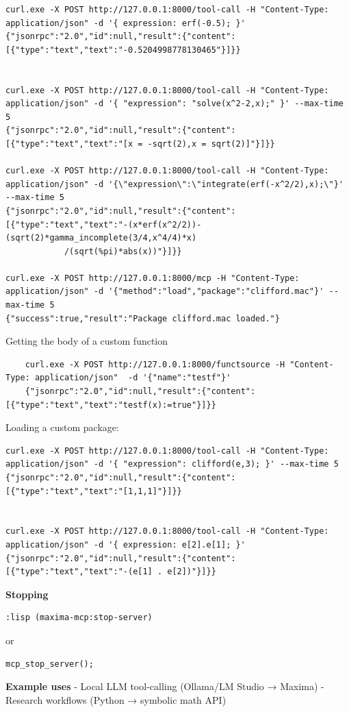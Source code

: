 \documentclass[12pt]{article}
\begin{document}
\begin{verbatim}
curl.exe -X POST http://127.0.0.1:8000/tool-call -H "Content-Type: application/json" -d '{ expression: erf(-0.5); }'
{"jsonrpc":"2.0","id":null,"result":{"content":[{"type":"text","text":"-0.5204998778130465"}]}}


curl.exe -X POST http://127.0.0.1:8000/tool-call -H "Content-Type: application/json" -d '{ "expression": "solve(x^2-2,x);" }' --max-time 5
{"jsonrpc":"2.0","id":null,"result":{"content":[{"type":"text","text":"[x = -sqrt(2),x = sqrt(2)]"}]}}

curl.exe -X POST http://127.0.0.1:8000/tool-call -H "Content-Type: application/json" -d '{\"expression\":\"integrate(erf(-x^2/2),x);\"}' --max-time 5
{"jsonrpc":"2.0","id":null,"result":{"content":[{"type":"text","text":"-(x*erf(x^2/2))-(sqrt(2)*gamma_incomplete(3/4,x^4/4)*x)
			/(sqrt(%pi)*abs(x))"}]}}

curl.exe -X POST http://127.0.0.1:8000/mcp -H "Content-Type: application/json" -d '{"method":"load","package":"clifford.mac"}' --max-time 5
{"success":true,"result":"Package clifford.mac loaded."}
\end{verbatim}

Getting the body of a custom function
\begin{verbatim}
	curl.exe -X POST http://127.0.0.1:8000/functsource -H "Content-Type: application/json"  -d '{"name":"testf"}'
	{"jsonrpc":"2.0","id":null,"result":{"content":[{"type":"text","text":"testf(x):=true"}]}}
\end{verbatim}


Loading a custom package: 

\begin{verbatim}
curl.exe -X POST http://127.0.0.1:8000/tool-call -H "Content-Type: application/json" -d '{ "expression": clifford(e,3); }' --max-time 5
{"jsonrpc":"2.0","id":null,"result":{"content":[{"type":"text","text":"[1,1,1]"}]}}


curl.exe -X POST http://127.0.0.1:8000/tool-call -H "Content-Type: application/json" -d '{ expression: e[2].e[1]; }'
{"jsonrpc":"2.0","id":null,"result":{"content":[{"type":"text","text":"-(e[1] . e[2])"}]}}
\end{verbatim}

\textbf{Stopping}

\begin{verbatim}
:lisp (maxima-mcp:stop-server)
\end{verbatim}

or

\begin{verbatim}
mcp_stop_server();
\end{verbatim}

\textbf{Example uses} - Local LLM tool-calling (Ollama/LM Studio →
Maxima) - Research workflows (Python → symbolic math API)
\end{document}
